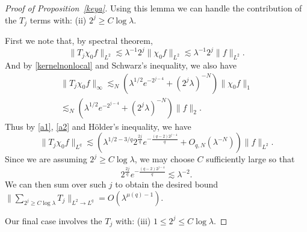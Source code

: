 \documentclass[10pt]{amsart}
\newcommand{\la}{\lambda}
\newcommand{\1}{{\bf 1}}
\begin{document}
\begin{proof}[Proof of Proposition~\ref{keya}]
Using this lemma we can handle the contribution of the $T_j$ terms with: 
\newline \noindent(ii) $2^j\ge C\log\la$.


First we note that, by spectral theorem,
\begin{equation}\label{a1}
    \|T_j \chi_0f\|_{L^2}\lesssim \la^{-1}2^j \|\chi_0f\|_{L^2}\lesssim \la^{-1}2^j \|f\|_{L^2}.
\end{equation}
And by \eqref{kernelnonlocal} and Schwarz's inequality, we also have
\begin{multline}\label{a2}
    \|T_j \chi_0f\|_\infty\lesssim_N (\la^{1/2}e^{-2^{j-4}}+(2^j\la)^{-N} )\|\chi_0f\|_1\\
    \lesssim_N (\la^{1/2}e^{-2^{j-4}}+(2^j\la)^{-N} )\|f\|_2.
\end{multline}
 Thus by  \eqref{a1}, \eqref{a2} and H\"older's inequality, we have
\begin{equation}\label{1a}
    \|T_j \chi_0f\|_{L^q}\lesssim \left(\la^{1/2-3/q}2^{\frac{2j}{q}}e^{-\tfrac{(q-2)2^{j-4}}{q}}+O_{q,N}(\la^{-N})\right) \|f\|_{L^2}.
\end{equation}
Since we are assuming $2^j\ge C\log\la$, we may choose $C$ sufficiently large so that $$2^{\frac{2j}{q}}e^{-\tfrac{(q-2)2^{j-4}}{q}}\lesssim \la^{-2}.$$ 
We can then sum over such $j$ to obtain the desired bound $\| \sum_{2^j\ge C\log \la } T_j\|_{L^2\to L^q}=O(\la^{\mu(q)-1})$.











\bigskip

Our final case involves the $T_j$ with:
\newline
\noindent(iii) $1\le 2^j\le C\log\la$.



\end{proof}
\end{document}
